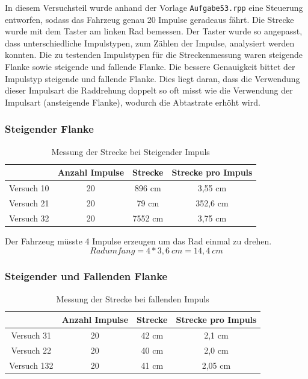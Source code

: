 \documentclass[a4paper, 12pt]{article}
\begin{document}
In diesem Versuchsteil wurde anhand der Vorlage \texttt{Aufgabe53.rpp} eine Steuerung entworfen, sodass das Fahrzeug genau 20 Impulse geradeaus fährt. Die Strecke wurde mit dem Taster am linken Rad bemessen.
Der Taster wurde so angepasst, dass unterschiedliche Impulstypen, zum Zählen der Impulse, analysiert werden konnten. Die zu testenden Impulstypen für die Streckenmessung waren \glqq steigende Flanke\grqq{} sowie \glqq steigende und fallende Flanke\grqq{}. 
Die bessere Genauigkeit bittet der Impulstyp \glqq steigende und fallende Flanke\grqq{}. Dies liegt daran, dass die Verwendung dieser Impulsart die Raddrehung doppelt so oft misst wie die Verwendung der Impulsart (ansteigende Flanke), wodurch die Abtastrate erhöht wird. 

\subsubsection*{Steigender Flanke}
\begin{table}[H]
  \centering\begin{tabular}{|c |c |c |c|}
    \hline 
    & \textbf{Anzahl Impulse} & \textbf{Strecke} & \textbf{Strecke pro Impuls} \\ \hline \hline 
    Versuch 10 & 20 & 896 cm & 3,55 cm \\ \hline 
    Versuch 21 & 20 & 79 cm & 352,6 cm \\ \hline 
    Versuch 32 & 20 & 7552 cm & 3,75 cm \\ \hline  
  \end{tabular}
  \caption{Messung der Strecke bei Steigender Impuls}
\end{table}
Der Fahrzeug müsste 4 Impulse erzeugen um das Rad einmal zu drehen. 
\[ Radumfang = 4 * 3,6 \ cm = 14,4 \ cm   \]

\subsubsection*{Steigender und Fallenden Flanke}
\begin{table}[H]
  \centering\begin{tabular}{|c |c |c |c|}
    \hline 
    & \textbf{Anzahl Impulse} & \textbf{Strecke} & \textbf{Strecke pro Impuls} \\ \hline \hline 
    Versuch 31 & 20 & 42 cm & 2,1 cm \\ \hline 
    Versuch 22 & 20 & 40 cm & 2,0 cm \\ \hline 
    Versuch 132 & 20 & 41 cm & 2,05 cm \\ \hline  
  \end{tabular}
  \caption{Messung der Strecke bei fallenden Impuls}
\end{table}
\end{document}
